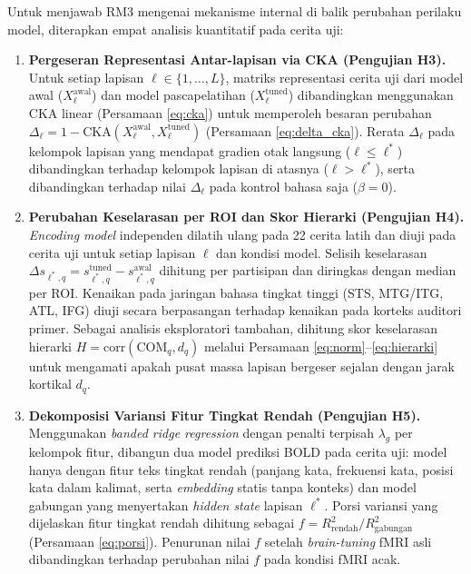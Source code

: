 Untuk menjawab RM3 mengenai mekanisme internal di balik perubahan perilaku model, diterapkan empat analisis kuantitatif pada cerita uji:
\begin{enumerate}
  \item \textbf{Pergeseran Representasi Antar-lapisan via CKA (Pengujian H3).} Untuk setiap lapisan $\ell \in \{1, \dots, L\}$, matriks representasi cerita uji dari model awal ($X_\ell^{\text{awal}}$) dan model pascapelatihan ($X_\ell^{\text{tuned}}$) dibandingkan menggunakan CKA linear (Persamaan \ref{eq:cka}) untuk memperoleh besaran perubahan $\Delta_\ell = 1 - \mathrm{CKA}(X_\ell^{\text{awal}}, X_\ell^{\text{tuned}})$ (Persamaan \ref{eq:delta_cka}). Rerata $\Delta_\ell$ pada kelompok lapisan yang mendapat gradien otak langsung ($\ell \le \ell^*$) dibandingkan terhadap kelompok lapisan di atasnya ($\ell > \ell^*$), serta dibandingkan terhadap nilai $\Delta_\ell$ pada kontrol bahasa saja ($\beta = 0$).
  \item \textbf{Perubahan Keselarasan per ROI dan Skor Hierarki (Pengujian H4).} \textit{Encoding model} independen dilatih ulang pada 22 cerita latih dan diuji pada cerita uji untuk setiap lapisan $\ell$ dan kondisi model. Selisih keselarasan $\Delta s_{\ell^*, q} = s^{\text{tuned}}_{\ell^*, q} - s^{\text{awal}}_{\ell^*, q}$ dihitung per partisipan dan diringkas dengan median per ROI. Kenaikan pada jaringan bahasa tingkat tinggi (STS, MTG/ITG, ATL, IFG) diuji secara berpasangan terhadap kenaikan pada korteks auditori primer. Sebagai analisis eksploratori tambahan, dihitung skor keselarasan hierarki $H = \mathrm{corr}(\mathrm{COM}_q, d_q)$ melalui Persamaan \ref{eq:norm}--\ref{eq:hierarki} untuk mengamati apakah pusat massa lapisan bergeser sejalan dengan jarak kortikal $d_q$.
  \item \textbf{Dekomposisi Variansi Fitur Tingkat Rendah (Pengujian H5).} Menggunakan \textit{banded ridge regression} \autocite{nunez2019banded} dengan penalti terpisah $\lambda_g$ per kelompok fitur, dibangun dua model prediksi BOLD pada cerita uji: model hanya dengan fitur teks tingkat rendah (panjang kata, frekuensi kata, posisi kata dalam kalimat, serta \textit{embedding} statis tanpa konteks) dan model gabungan yang menyertakan \textit{hidden state} lapisan $\ell^*$. Porsi variansi yang dijelaskan fitur tingkat rendah dihitung sebagai $f = R^2_{\text{rendah}} / R^2_{\text{gabungan}}$ (Persamaan \ref{eq:porsi}). Penurunan nilai $f$ setelah \textit{brain-tuning} fMRI asli dibandingkan terhadap perubahan nilai $f$ pada kondisi fMRI acak.
\end{enumerate}

